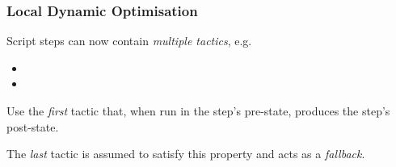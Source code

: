\begin{frame}
  \frametitle{Local Dynamic Optimisation}

  Script steps can now contain \emph{multiple tactics}, e.g.
  \begin{itemize}
    \item {}
    \item {}
  \end{itemize}

  \pause

  Use the \emph{first} tactic that, when run in the step's pre-state, produces the step's post-state.

  \pause

  The \emph{last} tactic is assumed to satisfy this property and acts as a \emph{fallback}.
\end{frame}

